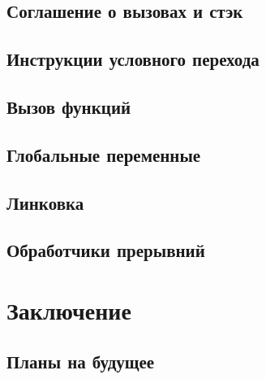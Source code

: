 \documentclass[a4paper,14pt]{extarticle}
\begin{document}
\subsection{Соглашение о вызовах и стэк}
\subsection{Инструкции условного перехода}
\subsection{Вызов функций}
\subsection{Глобальные переменные}
\subsection{Линковка}
\subsection{Обработчики прерывний}

\pagebreak
\section{Заключение}
\subsection{Планы на будущее}


\printbibliography
{}




	
\end{document}

